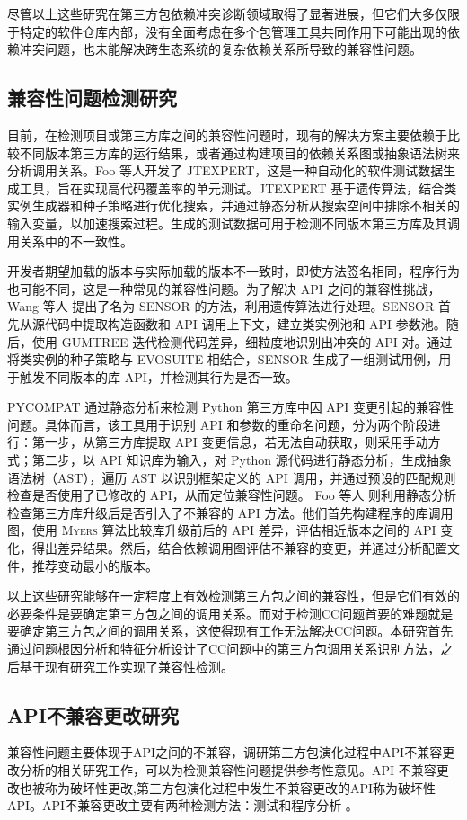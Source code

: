尽管以上这些研究在第三方包依赖冲突诊断领域取得了显著进展，但它们大多仅限于特定的软件仓库内部，没有全面考虑在多个包管理工具共同作用下可能出现的依赖冲突问题，也未能解决跨生态系统的复杂依赖关系所导致的兼容性问题。
\subsection{兼容性问题检测研究}
目前，在检测项目或第三方库之间的兼容性问题时，现有的解决方案主要依赖于比较不同版本第三方库的运行结果，或者通过构建项目的依赖关系图或抽象语法树来分析调用关系。Foo 等人开发了 JTEXPERT，这是一种自动化的软件测试数据生成工具，旨在实现高代码覆盖率的单元测试。JTEXPERT 基于遗传算法，结合类实例生成器和种子策略进行优化搜索，并通过静态分析从搜索空间中排除不相关的输入变量，以加速搜索过程。生成的测试数据可用于检测不同版本第三方库及其调用关系中的不一致性。

开发者期望加载的版本与实际加载的版本不一致时，即使方法签名相同，程序行为也可能不同，这是一种常见的兼容性问题。为了解决 API 之间的兼容性挑战，Wang 等人 提出了名为 SENSOR 的方法，利用遗传算法进行处理。SENSOR 首先从源代码中提取构造函数和 API 调用上下文，建立类实例池和 API 参数池。随后，使用 \textsc{GUMTREE} 迭代检测代码差异，细粒度地识别出冲突的 API 对。通过将类实例的种子策略与 \textsc{EVOSUITE} 相结合，SENSOR 生成了一组测试用例，用于触发不同版本的库 API，并检测其行为是否一致。

\textsc{PYCOMPAT} 通过静态分析来检测 Python 第三方库中因 API 变更引起的兼容性问题。具体而言，该工具用于识别 API 和参数的重命名问题，分为两个阶段进行：第一步，从第三方库提取 API 变更信息，若无法自动获取，则采用手动方式；第二步，以 API 知识库为输入，对 Python 源代码进行静态分析，生成抽象语法树（AST），遍历 AST 以识别框架定义的 API 调用，并通过预设的匹配规则检查是否使用了已修改的 API，从而定位兼容性问题。
Foo 等人 则利用静态分析检查第三方库升级后是否引入了不兼容的 API 方法。他们首先构建程序的库调用图，使用 \textsc{Myers} 算法比较库升级前后的 API 差异，评估相近版本之间的 API 变化，得出差异结果。然后，结合依赖调用图评估不兼容的变更，并通过分析配置文件，推荐变动最小的版本。

以上这些研究能够在一定程度上有效检测第三方包之间的兼容性，但是它们有效的必要条件是要确定第三方包之间的调用关系。而对于检测CC问题首要的难题就是要确定第三方包之间的调用关系，这使得现有工作无法解决CC问题。本研究首先通过问题根因分析和特征分析设计了CC问题中的第三方包调用关系识别方法，之后基于现有研究工作实现了兼容性检测。
\subsection{API不兼容更改研究}
兼容性问题主要体现于API之间的不兼容，调研第三方包演化过程中API不兼容更改分析的相关研究工作，可以为检测兼容性问题提供参考性意见。API 不兼容更改也被称为破坏性更改,第三方包演化过程中发生不兼容更改的API称为破坏性API。API不兼容更改主要有两种检测方法：测试和程序分析 。

